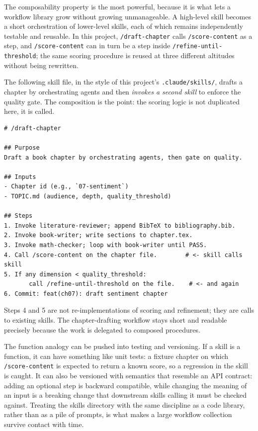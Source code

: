 The composability property is the most powerful, because it is what lets a workflow library grow without growing unmanageable. A high-level skill becomes a short orchestration of lower-level skills, each of which remains independently testable and reusable. In this project, \texttt{/draft-chapter} calls \texttt{/score-content} as a step, and \texttt{/score-content} can in turn be a step inside \texttt{/refine-until-threshold}; the same scoring procedure is reused at three different altitudes without being rewritten.

\begin{example}\label{ex:skill-calls-skill}
The following skill file, in the style of this project's \texttt{.claude/skills/}, drafts a chapter by orchestrating agents and then \emph{invokes a second skill} to enforce the quality gate. The composition is the point: the scoring logic is not duplicated here, it is called.

\begin{verbatim}
# /draft-chapter

## Purpose
Draft a book chapter by orchestrating agents, then gate on quality.

## Inputs
- Chapter id (e.g., `07-sentiment`)
- TOPIC.md (audience, depth, quality_threshold)

## Steps
1. Invoke literature-reviewer; append BibTeX to bibliography.bib.
2. Invoke book-writer; write sections to chapter.tex.
3. Invoke math-checker; loop with book-writer until PASS.
4. Call /score-content on the chapter file.        # <- skill calls skill
5. If any dimension < quality_threshold:
       call /refine-until-threshold on the file.    # <- and again
6. Commit: feat(ch07): draft sentiment chapter
\end{verbatim}

Steps 4 and 5 are not re-implementations of scoring and refinement; they are calls to existing skills. The chapter-drafting workflow stays short and readable precisely because the work is delegated to composed procedures.
\end{example}

\begin{deepdive}
The function analogy can be pushed into testing and versioning. If a skill is a function, it can have something like unit tests: a fixture chapter on which \texttt{/score-content} is expected to return a known score, so a regression in the skill is caught. It can also be versioned with semantics that resemble an API contract: adding an optional step is backward compatible, while changing the meaning of an input is a breaking change that downstream skills calling it must be checked against. Treating the skills directory with the same discipline as a code library, rather than as a pile of prompts, is what makes a large workflow collection survive contact with time.
\end{deepdive}

